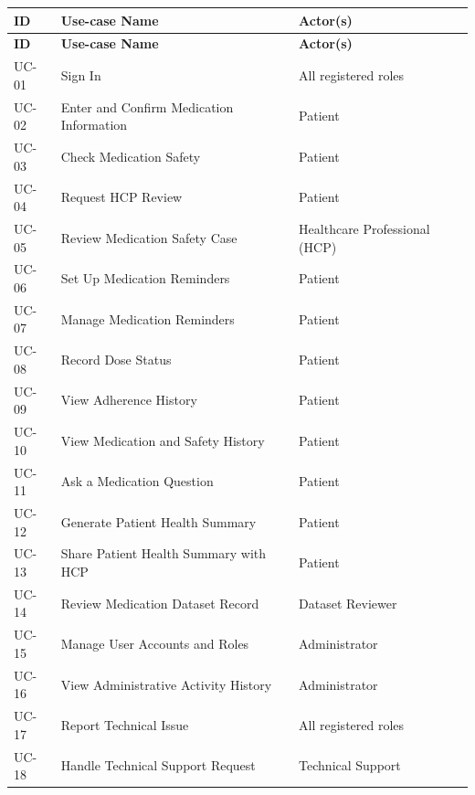 \begin{longtable}{|
    L{0.13\textwidth}|
    L{0.53\textwidth}|
    L{0.24\textwidth}|
}
\hline

\textbf{ID} &
\textbf{Use-case Name} &
\textbf{Actor(s)}
\\ \hline

\endfirsthead

\hline
\textbf{ID} &
\textbf{Use-case Name} &
\textbf{Actor(s)}
\\ \hline

\endhead

UC-01
& Sign In
& All registered roles
\\ \hline

UC-02
& Enter and Confirm Medication Information
& Patient
\\ \hline

UC-03
& Check Medication Safety
& Patient
\\ \hline

UC-04
& Request HCP Review
& Patient
\\ \hline

UC-05
& Review Medication Safety Case
& Healthcare Professional (HCP)
\\ \hline

UC-06
& Set Up Medication Reminders
& Patient
\\ \hline

UC-07
& Manage Medication Reminders
& Patient
\\ \hline

UC-08
& Record Dose Status
& Patient
\\ \hline

UC-09
& View Adherence History
& Patient
\\ \hline

UC-10
& View Medication and Safety History
& Patient
\\ \hline

UC-11
& Ask a Medication Question
& Patient
\\ \hline

UC-12
& Generate Patient Health Summary
& Patient
\\ \hline

UC-13
& Share Patient Health Summary with HCP
& Patient
\\ \hline

UC-14
& Review Medication Dataset Record
& Dataset Reviewer
\\ \hline

UC-15
& Manage User Accounts and Roles
& Administrator
\\ \hline

UC-16
& View Administrative Activity History
& Administrator
\\ \hline

UC-17
& Report Technical Issue
& All registered roles
\\ \hline

UC-18
& Handle Technical Support Request
& Technical Support
\\ \hline

\end{longtable}



